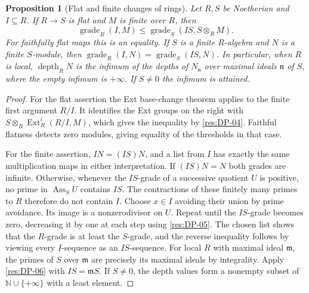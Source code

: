 \documentclass[11pt,oneside,openany]{book}
\newtheorem{proposition}[theorem]{Proposition}
\theoremstyle{definition}
\theoremstyle{remark}
\begin{document}
\begin{proposition}[Flat and finite changes of rings]\label{res:DP-08}
Let $R,S$ be Noetherian and $I\subseteq R$.
If $R\to S$ is flat and $M$ is finite over $R$, then
\[
 \operatorname{grade}_R(I,M)\le
 \operatorname{grade}_S(IS,S\otimes_R M).
\]
For faithfully flat maps this is an equality.
If $S$ is a finite $R$-algebra and $N$ is a finite $S$-module, then
$\operatorname{grade}_R(I,N)=\operatorname{grade}_S(IS,N)$.
In particular, when $R$ is local, $\operatorname{depth}_R N$ is
the infimum of the depths of $N_{\mathfrak n}$ over maximal ideals $\mathfrak n$
of $S$, where the empty infimum is $+\infty$. If $S\ne0$ the infimum is attained.
\end{proposition}
\begin{proof}
For the flat assertion the Ext base-change theorem
\cite[Theorem ALG-10-C03-S03]{p103} applies to the finite first
argument $R/I$. It identifies the Ext groups on the right with
$S\otimes_R\operatorname{Ext}_R^i(R/I,M)$, which gives the
inequality by \ref{res:DP-04}. Faithful flatness detects zero
modules, giving equality of the thresholds in that case.

For the finite assertion, $IN=(IS)N$, and a list from $I$ has
exactly the same multiplication maps in either interpretation.
If $(IS)N=N$ both grades are infinite. Otherwise, whenever the
$IS$-grade of a successive quotient $U$ is positive, no prime in
$\operatorname{Ass}_S U$ contains $IS$. The contractions of these
finitely many primes to $R$ therefore do not contain $I$. Choose
$x\in I$ avoiding their union by prime avoidance. Its image is a
nonzerodivisor on $U$. Repeat until the $IS$-grade becomes zero,
decreasing it by one at each step using \ref{res:DP-05}. The chosen
list shows that the $R$-grade is at least the $S$-grade, and the
reverse inequality follows by viewing every $I$-sequence as an
$IS$-sequence. For local $R$ with maximal ideal $\mathfrak m$,
the primes of $S$ over $\mathfrak m$ are precisely its maximal ideals
by integrality. Apply \ref{res:DP-06} with $IS=\mathfrak m S$. If $S\ne0$,
the depth values form a nonempty subset of $\mathbb N\cup\{+\infty\}$ with a least element.
\end{proof}
\end{document}
